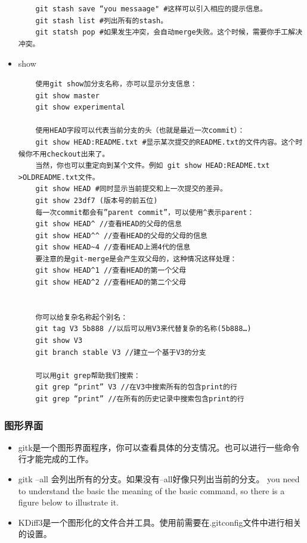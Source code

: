 \documentclass[a4paper,12pt,twoside]{book}
\begin{document}
\begin{CJK*}{UTF8}{song}
\begin{itemize}
\begin{verbatim}
    git stash save “you messaage" #这样可以引入相应的提示信息。
    git stash list #列出所有的stash。
    git statsh pop #如果发生冲突，会自动merge失败。这个时候，需要你手工解决冲突。

    \end{verbatim}
\item show
    \begin{verbatim}
    使用git show加分支名称，亦可以显示分支信息：
    git show master
    git show experimental

    使用HEAD字段可以代表当前分支的头（也就是最近一次commit）：
    git show HEAD:README.txt #显示某次提交的README.txt的文件内容。这个时候你不用checkout出来了。
    当然，你也可以重定向到某个文件。例如 git show HEAD:README.txt >OLDREADME.txt文件。
    git show HEAD #同时显示当前提交和上一次提交的差异。
    git show 23df7 (版本号的前五位)
    每一次commit都会有”parent commit”，可以使用^表示parent：
    git show HEAD^ //查看HEAD的父母的信息
    git show HEAD^^ //查看HEAD的父母的父母的信息
    git show HEAD~4 //查看HEAD上溯4代的信息
    要注意的是git-merge是会产生双父母的，这种情况这样处理：
    git show HEAD^1 //查看HEAD的第一个父母
    git show HEAD^2 //查看HEAD的第二个父母


    你可以给复杂名称起个别名：
    git tag V3 5b888 //以后可以用V3来代替复杂的名称(5b888…)
    git show V3
    git branch stable V3 //建立一个基于V3的分支

    可以用git grep帮助我们搜索：
    git grep “print” V3 //在V3中搜索所有的包含print的行
    git grep “print” //在所有的历史记录中搜索包含print的行
    \end{verbatim}
\end{itemize}

\subsubsection{图形界面}
    \begin{itemize}
    \item gitk是一个图形界面程序，你可以查看具体的分支情况。也可以进行一些命令行才能完成的工作。
    \item gitk --all 会列出所有的分支。如果没有--all好像只列出当前的分支。
    you need to understand the basic the meaning of the basic command, so there is a figure below to illustrate it. \\
    \item KDiff3是一个图形化的文件合并工具。使用前需要在.gitconfig文件中进行相关的设置。
    \end{itemize}


\end{CJK*}
\end{document}
